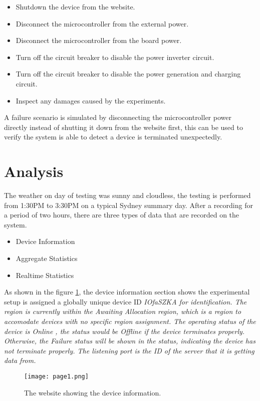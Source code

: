 \documentclass[../thesis.tex]{subfiles}
\begin{document}
\begin{itemize}
	\item Shutdown the device from the website.
	\item Disconnect the microcontroller from the external power.
	\item Disconnect the microcontroller from the board power.
	\item Turn off the circuit breaker to disable the power inverter circuit.
	\item Turn off the circuit breaker to disable the power generation and charging circuit.
	\item Inspect any damages caused by the experiments.
\end{itemize}

A failure scenario is simulated by disconnecting the microcontroller power directly instead of shutting it down from the website first, this can be used to verify the system is able to detect a device is terminated unexpectedly. 

\section{Analysis}

The weather on day of testing was sunny and cloudless, the testing is performed from 1:30PM to 3:30PM on a typical Sydney summary day. After a recording for a period of two hours, there are three types of data that are recorded on the system.

\begin{itemize}
	\item Device Information
	\item Aggregate Statistics
	\item Realtime Statistics
\end{itemize}

As shown in the figure \ref{fig:page1}, the device information section shows the experimental setup is assigned a globally unique device ID \em IOfaSZKA \em for identification. The region is currently within the \em Awaiting Allocation \em region, which is a region to accomodate devices with no specific region assignment. The operating status of the device is \em Online \em, the status would be \em Offline \em if the device terminates properly. Otherwise, the \em Failure \em status will be shown in the status, indicating the device has not terminate properly. The listening port is the ID of the server that it is getting data from. 

\begin{figure}[!ht]
	\centering
	\texttt{[image: page1.png]}
	\caption{The website showing the device information.}
	\label{fig:page1}
\end{figure}
\end{document}
